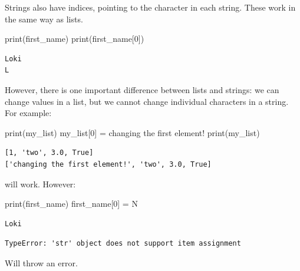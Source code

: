 \documentclass[
  letterpaper,
  DIV=11,
  numbers=noendperiod]{scrreprt}
\newenvironment{Shaded}{\begin{snugshade}}{\end{snugshade}}
\newcommand{\BuiltInTok}[1]{\textcolor[rgb]{0.00,0.23,0.31}{#1}}
\newcommand{\DecValTok}[1]{\textcolor[rgb]{0.68,0.00,0.00}{#1}}
\newcommand{\NormalTok}[1]{\textcolor[rgb]{0.00,0.23,0.31}{#1}}
\newcommand{\OperatorTok}[1]{\textcolor[rgb]{0.37,0.37,0.37}{#1}}
\newcommand{\StringTok}[1]{\textcolor[rgb]{0.13,0.47,0.30}{#1}}
\begin{document}
Strings also have indices, pointing to the character in each string.
These work in the same way as lists.

\begin{Shaded}
\begin{Highlighting}[]
\BuiltInTok{print}\NormalTok{(first\_name)}
\BuiltInTok{print}\NormalTok{(first\_name[}\DecValTok{0}\NormalTok{])}
\end{Highlighting}
\end{Shaded}

\begin{verbatim}
Loki
L
\end{verbatim}

However, there is one important difference between lists and strings: we
can change values in a list, but we cannot change individual characters
in a string. For example:

\begin{Shaded}
\begin{Highlighting}[]
\BuiltInTok{print}\NormalTok{(my\_list)}
\NormalTok{my\_list[}\DecValTok{0}\NormalTok{] }\OperatorTok{=} \StringTok{\textquotesingle{}changing the first element!\textquotesingle{}}
\BuiltInTok{print}\NormalTok{(my\_list)}
\end{Highlighting}
\end{Shaded}

\begin{verbatim}
[1, 'two', 3.0, True]
['changing the first element!', 'two', 3.0, True]
\end{verbatim}

will work. However:

\begin{Shaded}
\begin{Highlighting}[]
\BuiltInTok{print}\NormalTok{(first\_name)}
\NormalTok{first\_name[}\DecValTok{0}\NormalTok{] }\OperatorTok{=} \StringTok{\textquotesingle{}N\textquotesingle{}}
\end{Highlighting}
\end{Shaded}

\begin{verbatim}
Loki
\end{verbatim}

\begin{verbatim}
TypeError: 'str' object does not support item assignment
\end{verbatim}

Will throw an error.
\end{document}
